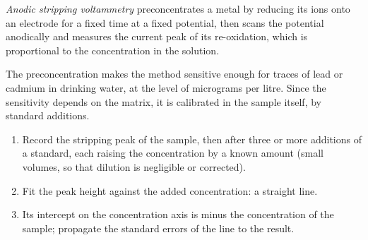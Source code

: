 \begin{definition}\label{def:b3:electrode-kinetics:stripping}
\emph{Anodic stripping voltammetry}
preconcentrates a metal by reducing its ions onto an electrode for a fixed time
at a fixed potential, then scans the potential anodically and measures the
current peak of its re-oxidation, which is proportional to the concentration
in the solution.
\end{definition}

The preconcentration makes the method sensitive enough for traces of lead or
cadmium in drinking water, at the level of micrograms per litre. Since the
sensitivity depends on the matrix, it is calibrated in the sample itself, by
standard additions.

\begin{method}\label{met:b3:electrode-kinetics:standard-addition}
\begin{enumerate}
  \item Record the stripping peak of the sample, then after three or more
        additions of a standard, each raising the concentration by a known
        amount (small volumes, so that dilution is negligible or corrected).
  \item Fit the peak height against the added concentration: a straight line.
  \item Its intercept on the concentration axis is minus the concentration of the
        sample; propagate the standard errors of the line to the result.
\end{enumerate}
\end{method}

